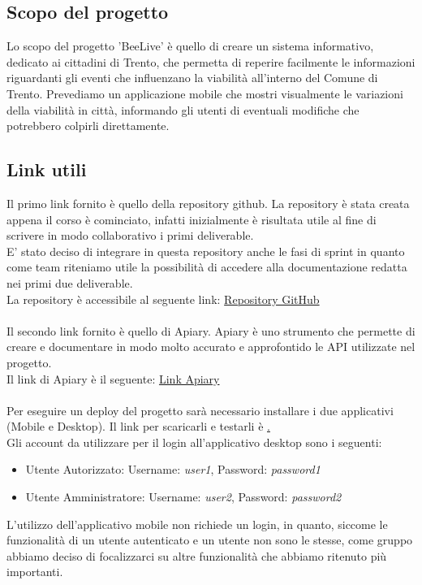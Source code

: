 \documentclass{article}
\begin{document}
\subsection{Scopo del progetto}

Lo scopo del progetto 'BeeLive' è quello di creare un sistema informativo, dedicato ai cittadini di Trento, che permetta di reperire facilmente le informazioni riguardanti gli eventi che influenzano la viabilità all'interno del Comune di Trento. Prevediamo un applicazione mobile che mostri visualmente le variazioni della viabilità in città, informando gli utenti di eventuali modifiche che potrebbero colpirli direttamente. 

\subsection{Link utili}
Il primo link fornito è quello della repository github. La repository è stata creata appena il corso è cominciato, infatti inizialmente è risultata utile al fine di scrivere in modo collaborativo i primi deliverable.\\
E' stato deciso di integrare in questa repository anche le fasi di sprint in quanto come team riteniamo utile la possibilità di accedere alla documentazione redatta nei primi due deliverable.\\
La repository è accessibile al seguente link: \href{https://github.com/ELI20ZIVI/BeeLive/}{Repository GitHub}\\ \\
Il secondo link fornito è quello di Apiary. Apiary è uno strumento che permette di creare e documentare in modo molto accurato e approfontido le API utilizzate nel progetto.\\
Il link di Apiary è il seguente: \href{https://beelive.docs.apiary.io/#}{Link Apiary}\\ \\
Per eseguire un deploy del progetto sarà necessario installare i due applicativi (Mobile e Desktop). Il link per scaricarli e testarli è \href{github-release-page}.\\
Gli account da utilizzare per il login all'applicativo desktop sono i seguenti:
\begin{itemize}
    \item Utente Autorizzato: Username: \textit{user1}, Password: \textit{password1}
    \item Utente Amministratore: Username: \textit{user2}, Password: \textit{password2}
\end{itemize}
L'utilizzo dell'applicativo mobile non richiede un login, in quanto, siccome le funzionalità di un utente autenticato e un utente non sono le stesse, come gruppo abbiamo deciso di focalizzarci su altre funzionalità che abbiamo ritenuto più importanti.
\end{document}
